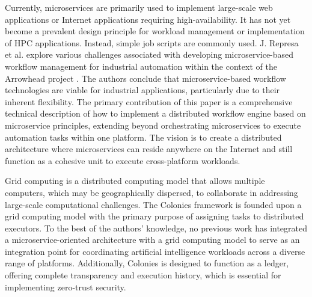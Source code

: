 \documentclass{article}
\begin{document}
Currently, microservices are primarily used to implement large-scale web applications or Internet applications requiring high-availability. It has not yet become a prevalent design principle for workload management or implementation of HPC applications. Instead, simple job scripts are commonly used. J. Represa et al. \cite{GarciaRepresa1740746, GarciaRepresa1640771} explore various challenges associated with developing microservice-based workflow management for industrial automation within the context of the Arrowhead project \cite{delsing2017iot}. The authors conclude that microservice-based workflow technologies are viable for industrial applications, particularly due to their inherent flexibility. The primary contribution of this paper is a comprehensive technical description of how to implement a distributed workflow engine based on microservice principles, extending beyond orchestrating microservices to execute automation tasks within one platform. The vision is to create a distributed architecture where microservices can reside anywhere on the Internet and still function as a cohesive unit to execute cross-platform workloads.  

Grid computing \cite{grid_computing} is a distributed computing model that allows multiple computers, which may be geographically dispersed, to collaborate in addressing large-scale computational challenges. The Colonies framework is founded upon a grid computing model with the primary purpose of assigning tasks to distributed executors. To the best of the authors' knowledge, no previous work has integrated a microservice-oriented architecture with a grid computing model to serve as an integration point for coordinating artificial intelligence workloads across a diverse range of platforms. Additionally, Colonies is designed to function as a ledger, offering complete transparency and execution history, which is essential for implementing zero-trust security.
\end{document}
